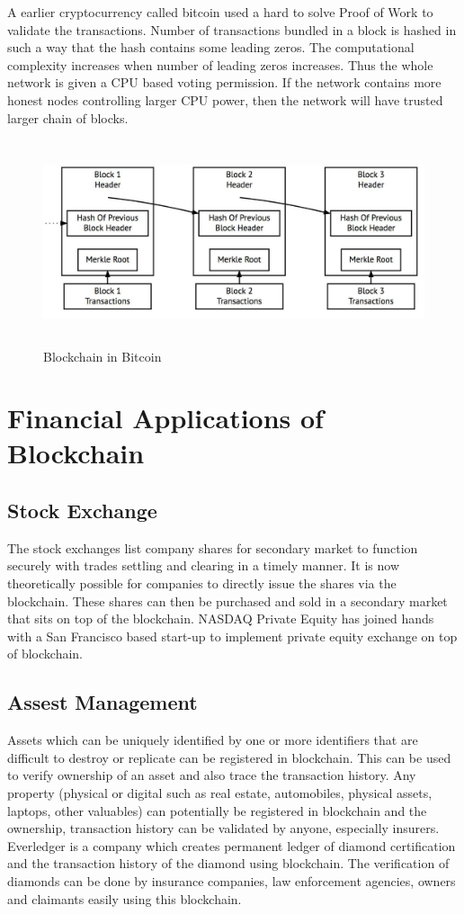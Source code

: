 A earlier cryptocurrency called bitcoin used a hard to solve Proof of Work to validate the transactions. Number of transactions bundled in a block is hashed in such a way that the hash contains some leading zeros. The computational complexity increases when number of leading zeros increases. Thus the whole network is given a CPU based voting permission. If the network contains more honest nodes controlling larger CPU power, then the network will have trusted larger chain of blocks.
\begin{figure}[htb!]
  \centering
 \includegraphics[width = 15cm, height = 6cm] {Figures/bitcoin.jpg}
  \caption{Blockchain in Bitcoin}
  \label{StH}	
\end{figure}
\newline

\section{Financial Applications of Blockchain}
\subsection{Stock Exchange}
The stock exchanges list company shares for secondary market to function securely with trades settling and clearing in a timely manner. It is now theoretically possible for companies to directly issue the shares via the blockchain. These shares can then be purchased and sold in a secondary market that sits on top of the blockchain. NASDAQ Private Equity has joined hands with a San Francisco based start-up to implement private equity exchange on top of blockchain.

\subsection{Assest Management}
Assets which can be uniquely identified by one or more identifiers that are difficult to destroy or replicate can be registered in blockchain. This can be used to verify ownership of an asset and also trace the transaction history. Any property (physical or digital such as real estate, automobiles, physical assets, laptops, other valuables) can potentially be registered in blockchain and the ownership, transaction history can be validated by anyone, especially insurers. Everledger is a company which creates permanent ledger of diamond certification and the transaction history of the diamond using blockchain. The verification of diamonds can be done by insurance companies, law enforcement agencies, owners and claimants easily using this blockchain.

